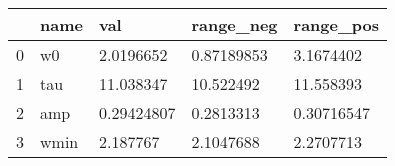 \begin{tabular}{lllll}
\toprule
{} &  name &         val &   range\_neg &   range\_pos \\
\midrule
0 &    w0 &   2.0196652 &  0.87189853 &   3.1674402 \\
1 &   tau &   11.038347 &   10.522492 &   11.558393 \\
2 &   amp &  0.29424807 &   0.2813313 &  0.30716547 \\
3 &  wmin &    2.187767 &   2.1047688 &   2.2707713 \\
\bottomrule
\end{tabular}
